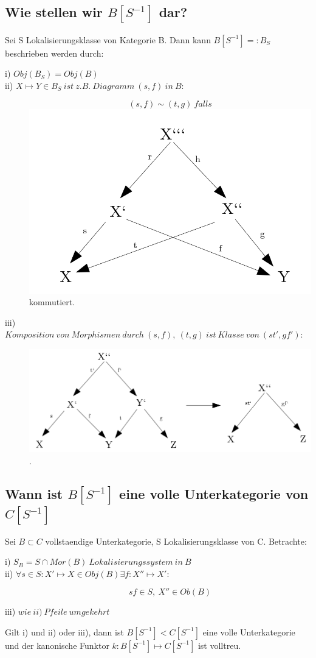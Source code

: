 \documentclass[12pt]{article}
\begin{document}
\subsection{Wie stellen wir $B[S^{-1}]$ dar?}

Sei S Lokalisierungsklasse von Kategorie B. Dann kann $B[S^{-1}] =: B_S$ beschrieben werden durch:
\begin{description}
    \item[i) $Obj(B_S) = Obj(B)$]
    \item[ii) $X \mapsto Y \in B_S \: ist \: z.B. \: Diagramm \: (s,f) \: in \: B$:]
        \[(s,f) \sim (t, g) \: falls\]
		\includegraphics[scale=0.35]{roof-a_2.png} kommutiert.
    \item[iii) $Komposition \: von \: Morphismen \: durch \: (s,f), \: (t,g) \: ist \: Klasse \: von \: (st',gf')$:]
		\includegraphics[scale=0.5]{roof-b.png}.
\end{description}

\subsection{Wann ist $B[S^{-1}]$ eine volle Unterkategorie von $C[S^{-1}]$}

Sei $B \subset C$ vollstaendige Unterkategorie, S Lokalisierungsklasse von C. Betrachte:
\begin{description}
    \item[i) $S_B = S \cap Mor(B) \: Lokalisierungssystem \: in \: B$]
    \item[ii) $\forall s \in S : X' \mapsto X \in Obj(B) \exists f : X'' \mapsto X'$:]
        \[sf \in S, \: X'' \in Ob(B)\]
    \item[iii) $wie \: ii) \: Pfeile \: umgekehrt$]   
\end{description}
Gilt i) und ii) oder iii), dann ist $B[S^{-1}] < C[S^{-1}]$ eine volle Unterkategorie und der kanonische Funktor
$k : B[S^{-1}] \mapsto C[S^{-1}]$ ist volltreu. 
\end{document}
